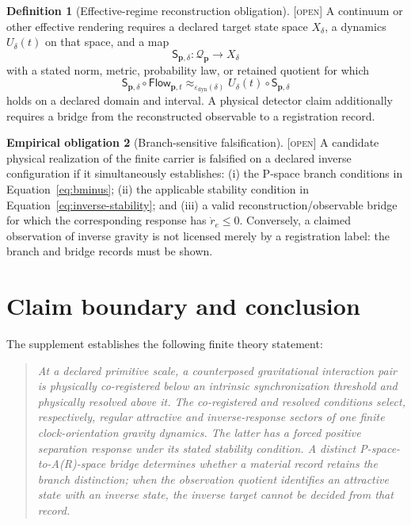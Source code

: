 \documentclass[11pt]{article}
\newcommand{\State}{\ensuremath{\mathcal Q}}
\newcommand{\Flow}{\ensuremath{\mathsf{Flow}}}
\newcommand{\Open}{\textsc{[open]}}
\theoremstyle{definition}
\newtheorem{definition}{Definition}[section]
\newtheorem{obligation}[definition]{Empirical obligation}
\begin{document}
\begin{definition}[Effective-regime reconstruction obligation]
\label{def:reconstruction}
\Open{} A continuum or other effective rendering requires a declared target
state space $X_\delta$, a dynamics $U_\delta(t)$ on that space, and a map
\begin{equation}
\mathsf S_{\mathbf p,\delta}:\State_{\mathbf p}\longrightarrow X_\delta
\label{eq:reconstruction}
\end{equation}
with a stated norm, metric, probability law, or retained quotient for which
\begin{equation}
\mathsf S_{\mathbf p,\delta}\circ\Flow_{\mathbf p,t}
\approx_{\varepsilon_{\mathrm{dyn}}(\delta)}
U_\delta(t)\circ\mathsf S_{\mathbf p,\delta}
\label{eq:effective-recovery}
\end{equation}
holds on a declared domain and interval.  A physical detector claim additionally
requires a bridge from the reconstructed observable to a registration record.
\end{definition}

\begin{obligation}[Branch-sensitive falsification]
\label{obl:falsification}
\Open{} A candidate physical realization of the finite carrier is falsified on a
declared inverse configuration if it simultaneously establishes: (i) the
P-space branch conditions in Equation~\eqref{eq:bminus}; (ii) the applicable
stability condition in Equation~\eqref{eq:inverse-stability}; and (iii) a valid
reconstruction/observable bridge for which the corresponding response has
$\dot r_e\le0$.  Conversely, a claimed observation of inverse gravity is not
licensed merely by a registration label: the branch and bridge records must be
shown.
\end{obligation}

\section{Claim boundary and conclusion}
\label{sec:conclusion}

The supplement establishes the following finite theory statement:
\begin{quote}
\emph{At a declared primitive scale, a counterposed gravitational interaction
pair is physically co-registered below an intrinsic synchronization threshold and
physically resolved above it.  The co-registered and resolved conditions select,
respectively, regular attractive and inverse-response sectors of one finite
clock-orientation gravity dynamics.  The latter has a forced positive separation
response under its stated stability condition.  A distinct P-space-to-A(R)-space
bridge determines whether a material record retains the branch distinction; when
the observation quotient identifies an attractive state with an inverse state,
the inverse target cannot be decided from that record.}
\end{quote}
\end{document}
